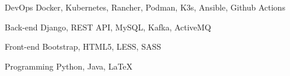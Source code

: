 

\begin{cvskills}

    \cvskill
    {DevOps} %
    {Docker, Kubernetes, Rancher, Podman, K3s, Ansible, Github Actions} %

    \cvskill
    {Back-end} %
    {Django, REST API, MySQL, Kafka, ActiveMQ} %

    \cvskill
    {Front-end} %
    {Bootstrap, HTML5, LESS, SASS} %

    \cvskill
    {Programming} %
    {Python, Java, LaTeX} %

\end{cvskills}
